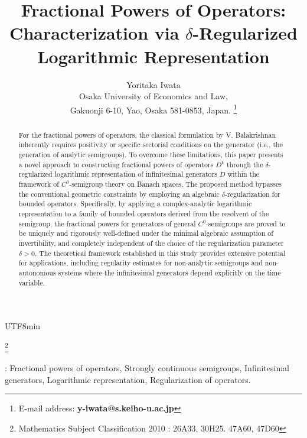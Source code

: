 \documentclass[10pt,a4paper]{article}
\theoremstyle{definition}
\theoremstyle{remark}
\begin{document}
 
\begin{CJK}{UTF8}{min}

\title{Fractional Powers of Operators: Characterization via $\delta$-Regularized Logarithmic Representation}
\author{
Yoritaka Iwata\\
Osaka University of Economics and Law, \\
Gakuonji 6-10, Yao, Osaka 581-0853, Japan. 
\thanks{
E-mail address: 
{\bf y-iwata@s.keiho-u.ac.jp}}}

\date{}
\maketitle

\thanks{Mathematics Subject Classification 2010 : 26A33, 30H25. 47A60, 47D60}

\begin{abstract}
For the fractional powers of operators, the classical formulation by V. Balakrishnan inherently requires positivity or specific sectorial conditions on the generator (i.e., the generation of analytic semigroups).
To overcome these limitations, this paper presents a novel approach to constructing fractional powers of operators $D^k$ through the $\delta$-regularized logarithmic representation of infinitesimal generators $D$ within the framework of $C^0$-semigroup theory on Banach spaces.
The proposed method bypasses the conventional geometric constraints by employing an algebraic $\delta$-regularization for bounded operators.
Specifically, by applying a complex-analytic logarithmic representation to a family of bounded operators derived from the resolvent of the semigroup, the fractional powers for generators of general $C^0$-semigroups are proved to be uniquely and rigorously well-defined under the minimal algebraic assumption of invertibility, and completely independent of the choice of the regularization parameter $\delta > 0$.
The theoretical framework established in this study provides extensive potential for applications, including regularity estimates for non-analytic semigroups and non-autonomous systems where the infinitesimal generators depend explicitly on the time variable.
\end{abstract}

\vspace{2mm}
: Fractional powers of operators, Strongly continuous semigroups, Infinitesimal generators, Logarithmic representation, Regularization of operators.
\vspace{2mm}


\end{CJK}
\end{document}
